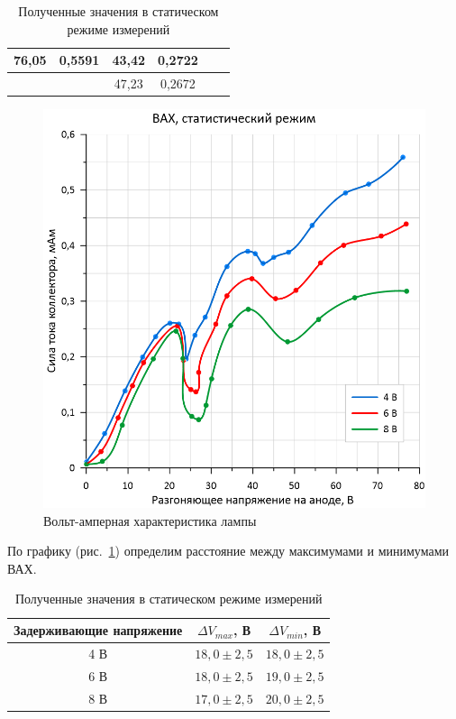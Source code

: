 \documentclass[a4paper, 12pt]{article}
\begin{document}
\begin{table}[h!]
\begin{center}
\begin{tabular}{|cccccc|}
\multicolumn{1}{|c|}{{ 76,05}} & \multicolumn{1}{c|}{{ 0,5591}}  & \multicolumn{1}{c|}{{ 43,42}} & \multicolumn{1}{c|}{{ 0,2722}} & \multicolumn{1}{c|}{{ }}      & { }       \\ \hline
\multicolumn{1}{|c|}{{ }}      & \multicolumn{1}{c|}{{ }}        & \multicolumn{1}{c|}{{ 47,23}} & \multicolumn{1}{c|}{{ 0,2672}} & \multicolumn{1}{c|}{{ }}      & { }       \\ \hline
\end{tabular}
\end{center}
\caption{Полученные значения в статическом режиме измерений}
\label{tab:static}
\end{table}

\begin{figure}[h!]
\begin{center}
    \includegraphics[width=0.7\linewidth]{2_1.png}
\end{center}
\caption{Вольт-амперная характеристика лампы}
\label{fig:plot}
\end{figure}

По графику (рис.~\ref{fig:plot}) определим расстояние между максимумами и минимумами ВАХ.

\begin{table}[h!]
\begin{center}
\begin{tabular}{|c|c|c|}
\hline 
Задерживающие напряжение & $\Delta{V_{max}}$, В & $\Delta{V_{min}}$, В \\ 
\hline 
4 В & $18,0\pm2,5$ & $18,0\pm2,5$ \\ 
\hline 
6 В & $18,0\pm2,5$ & $19,0\pm2,5$ \\ 
\hline 
8 В & $17,0\pm2,5$ & $20,0\pm2,5$ \\ 
\hline 
\end{tabular} 
\end{center}
\caption{Полученные значения в статическом режиме измерений}
\label{tab:stat}
\end{table}
\end{document}
